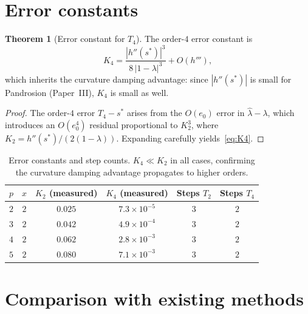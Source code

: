 \documentclass[11pt,a4paper]{article}
\theoremstyle{definition}
\newtheorem{theorem}{Theorem}[section]
\begin{document}
\section{Error constants}
\label{sec:constants}

\begin{theorem}[Error constant for $T_4$]
\label{thm:K4}
The order-$4$ error constant is
\begin{equation}
  \label{eq:K4}
  K_4 = \frac{|h''(s^*)|^3}{8\,|1-\lambda|^3} + O(h'''),
\end{equation}
which inherits the curvature damping advantage: since $|h''(s^*)|$ is small for Pandrosion (Paper~III), $K_4$ is small as well.
\end{theorem}

\begin{proof}
The order-$4$ error $T_4 - s^*$ arises from the $O(e_0)$ error in $\hat\lambda - \lambda$, which introduces an $O(e_0^4)$ residual proportional to $K_2^3$, where $K_2 = h''(s^*)/(2(1-\lambda))$.  Expanding carefully yields~\eqref{eq:K4}.
\end{proof}

\begin{table}[H]
\centering
\begin{tabular}{cccccc}
\toprule
$p$ & $x$ & $K_2$ (measured) & $K_4$ (measured) & Steps $T_2$ & Steps $T_4$ \\
\midrule
$2$ & $2$ & $0.025$ & $7.3 \times 10^{-5}$ & $3$ & $2$ \\
$3$ & $2$ & $0.042$ & $4.9 \times 10^{-4}$ & $3$ & $2$ \\
$4$ & $2$ & $0.062$ & $2.8 \times 10^{-3}$ & $3$ & $2$ \\
$5$ & $2$ & $0.080$ & $7.1 \times 10^{-3}$ & $3$ & $2$ \\
\bottomrule
\end{tabular}
\caption{Error constants and step counts.  $K_4 \ll K_2$ in all cases, confirming the curvature damping advantage propagates to higher orders.}
\label{tab:K4}
\end{table}

\section{Comparison with existing methods}
\label{sec:comparison}
\end{document}
